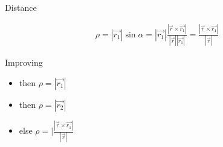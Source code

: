 \documentclass[10pt]{beamer}
\begin{document}
\begin{frame}{Distance}
		\begin{figure}[h]
		\end{figure}
		\begin{align*}
				\rho  = |\overrightarrow{r_1}|\sin\alpha 
				      = |\overrightarrow{r_1}|\frac{|\overrightarrow{r} \times \overrightarrow{r_1}|}
				                                   {|\overrightarrow{r}||\overrightarrow{r_1}|}
				      = \frac{|\overrightarrow{r}\times \overrightarrow{r_1}|}{|\overrightarrow{r}|}
		\end{align*}
\end{frame}
\begin{frame}{Improving}
		\begin{figure}[h]
		\end{figure}
			\begin{itemize}
				\item{  
					then $\rho=|\overrightarrow{r_1}|$
					}
				\item{  
					then $\rho=|\overrightarrow{r_2}|$
					}
				\item{ \makebox[2.5cm]{} else 
				$\rho = |\frac{|\overrightarrow{r}\times \overrightarrow{r_1}|}{|\overrightarrow{r}|}$}
			\end{itemize}
\end{frame}
\end{document}
